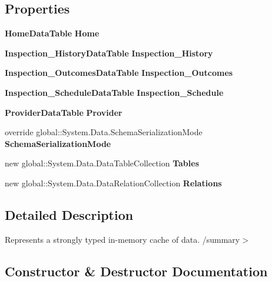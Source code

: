 \subsection*{Properties}
\begin{DoxyCompactItemize}
\item 
\textbf{ Home\+Data\+Table} \textbf{ Home}\hspace{0.3cm}{\ttfamily  [get]}
\item 
\textbf{ Inspection\+\_\+\+History\+Data\+Table} \textbf{ Inspection\+\_\+\+History}\hspace{0.3cm}{\ttfamily  [get]}
\item 
\textbf{ Inspection\+\_\+\+Outcomes\+Data\+Table} \textbf{ Inspection\+\_\+\+Outcomes}\hspace{0.3cm}{\ttfamily  [get]}
\item 
\textbf{ Inspection\+\_\+\+Schedule\+Data\+Table} \textbf{ Inspection\+\_\+\+Schedule}\hspace{0.3cm}{\ttfamily  [get]}
\item 
\textbf{ Provider\+Data\+Table} \textbf{ Provider}\hspace{0.3cm}{\ttfamily  [get]}
\item 
override global\+::\+System.\+Data.\+Schema\+Serialization\+Mode \textbf{ Schema\+Serialization\+Mode}\hspace{0.3cm}{\ttfamily  [get, set]}
\item 
new global\+::\+System.\+Data.\+Data\+Table\+Collection \textbf{ Tables}\hspace{0.3cm}{\ttfamily  [get]}
\item 
new global\+::\+System.\+Data.\+Data\+Relation\+Collection \textbf{ Relations}\hspace{0.3cm}{\ttfamily  [get]}
\end{DoxyCompactItemize}


\subsection{Detailed Description}
Represents a strongly typed in-\/memory cache of data. /summary$>$ 

\subsection{Constructor \& Destructor Documentation}
\mbox{\label{class_a_f_h___scheduler_1_1_home_inspection_db_data_set_ab3dd4d0342369c4473cf657cf603e255}} 
